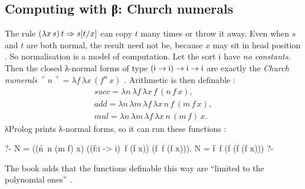 \subsection{Computing with β: Church numerals}\label{sec:lambda-church}

The rule $(\lambda x\,s)\,t\Rightarrow s[t/x]$ can copy $t$ many times or throw it away. Even when
$s$ and $t$ are both normal, the result need not be, because $x$ may sit in head position
. So normalisation is a model of computation. Let the sort $\mathsf{i}$ have \emph{no constants}.
Then the closed λ-normal forms of type $(\mathsf{i}\to\mathsf{i})\to\mathsf{i}\to\mathsf{i}$ are exactly
the \emph{Church numerals} $\ulcorner n\urcorner=\lambda f\,\lambda x\,(f^n\,x)$ . Arithmetic
is then definable :
\[
\begin{gathered}
  \mathit{succ}=\lambda n\,\lambda f\,\lambda x\,f\,(n\,f\,x),\\
  \mathit{add}=\lambda n\,\lambda m\,\lambda f\,\lambda x\,n\,f\,(m\,f\,x),\\
  \mathit{mul}=\lambda n\,\lambda m\,\lambda f\,\lambda x\,n\,(m\,f)\,x .
\end{gathered}
\]
λProlog prints λ-normal forms, so it can run these functions :
\begin{lprolog}
?- N = ((n\m\f\x\ n (m f) x) ((f:i -> i)\x\ f (f x)) (f\x\ f (f x))).
N = f\x\ f (f (f (f x)))
?-
\end{lprolog}
The book adds that the functions definable this way are \enquote{limited to the polynomial ones}
.

